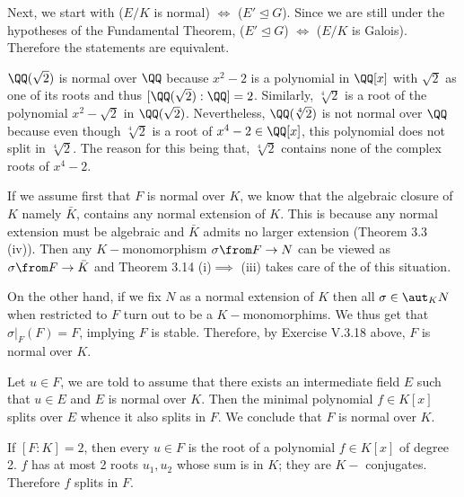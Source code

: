 Next, we start with ($E/K$ is normal) $\iff$ ($E'\unlhd G$). Since we are still under the hypotheses of the Fundamental Theorem, ($E'\unlhd G$) $\iff$ ($E/K$ is Galois). Therefore the statements are equivalent.

$\QQ(\sqrt 2)$ is normal over $\QQ$ because $x^2-2$ is a polynomial in $\QQ[x]$ with $\sqrt 2$ as one of its roots and thus $[\QQ(\sqrt 2):\QQ]=2$. Similarly, $\sqrt[4] 2$ is a root of the polynomial $x^2-\sqrt 2$ in $\QQ(\sqrt 2)$. Nevertheless, $\QQ(\sqrt[4] 2)$ is not normal over $\QQ$ because even though $\sqrt[4]2$ is a root of $x^4-2\in \QQ[x]$, this polynomial does not split in $ \sqrt[4]2$. The reason for this being that, $\sqrt[4]2$ contains none of the complex roots of $x^4-2$.

If we assume first that $F$ is normal over $K$, we know that the algebraic closure of $K$ namely $\bar K$, contains any normal extension of $K$. This is because any normal extension must be algebraic and $\bar K$ admits no larger extension (Theorem 3.3 (iv)). Then any $K-$monomorphism $\sigma \from F\to N$ can be viewed as $\sigma \from F\to \bar K$ and Theorem 3.14 (i)$\implies $ (iii) takes care of the of this situation.

On the other hand, if we fix $N$ as a normal extension of $K$ then all $\sigma\in \aut_KN$ when restricted to $F$ turn out to be a $K-$monomorphims. We thus get that $\sigma|_F(F)=F$, implying $F$ is stable. Therefore, by Exercise V.3.18 above, $F$ is normal over $K$.

Let $u\in F$, we are told to assume that there exists an intermediate field $E$ such that $u\in E$ and $E$ is normal over $K$. Then the minimal polynomial $f\in K[x]$ splits over $E$ whence it also splits in $F$. We conclude that $F$ is normal over $K$. 

If $[F:K]=2$, then every $u\in F$ is the root of a polynomial $f\in K[x]$ of degree 2.  $f$ has at most 2 roots $u_1,u_2$ whose sum is in $K$; they are $K-$ conjugates. Therefore $f$ splits in $F$.

